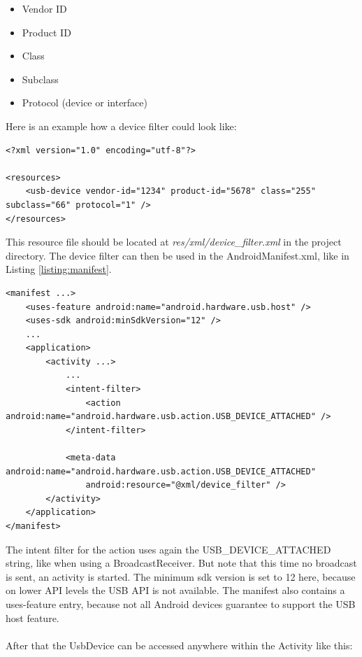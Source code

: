 \begin{itemize}
\item Vendor ID
\item Product ID
\item Class
\item Subclass
\item Protocol (device or interface)
\end{itemize}

Here is an example how a device filter could look like:

\lstset{language=XML}
\begin{lstlisting}[caption=Example device filter \cite{android_usb_host}, label=listing:device_filter]
<?xml version="1.0" encoding="utf-8"?>

<resources>
    <usb-device vendor-id="1234" product-id="5678" class="255" subclass="66" protocol="1" />
</resources>
\end{lstlisting}

This resource file should be located at \textit{res/xml/device\_filter.xml} in the project directory\cite{android_usb_host}. The device filter can then be used in the AndroidManifest.xml, like in Listing \ref{listing:manifest}.

\begin{lstlisting}[caption=AndroidManifest.xml \cite{android_usb_host}, label=listing:manifest]
<manifest ...>
    <uses-feature android:name="android.hardware.usb.host" />
    <uses-sdk android:minSdkVersion="12" />
    ...
    <application>
        <activity ...>
            ...
            <intent-filter>
                <action android:name="android.hardware.usb.action.USB_DEVICE_ATTACHED" />
            </intent-filter>

            <meta-data android:name="android.hardware.usb.action.USB_DEVICE_ATTACHED"
                android:resource="@xml/device_filter" />
        </activity>
    </application>
</manifest>
\end{lstlisting}

The intent filter for the action uses again the USB\_DEVICE\_ATTACHED string, like when using a BroadcastReceiver. But note that this time no broadcast is sent, an activity is started. The minimum sdk version is set to 12 here, because on lower API levels the USB API is not available. The manifest also contains a uses-feature entry, because not all Android devices guarantee to support the USB host feature\cite{android_usb_host}.\\\\
After that the UsbDevice can be accessed anywhere within the Activity like this:


